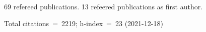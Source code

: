 69 refereed publications. 13 refeered publications as first author.

Total citations~=~2219; h-index~=~23 (2021-12-18)